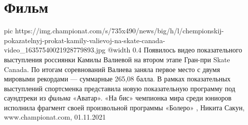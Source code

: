  
 
 
 
 
\chapter{Фильм}

\ifcmt
  pic https://img.championat.com/s/735x490/news/big/h/l/chempionskij-pokazatelnyj-prokat-kamily-valievoj-na-skate-canada-video_16357540021928779893.jpg
  @width 0.4
\fi
Появилось видео показательного выступления россиянки Камилы Валиевой на втором
этапе Гран-при Skate Canada. По итогам соревнований Валиева заняла первое место
с двумя мировыми рекордами — суммарные 265,08 балла.  В рамках показательных
выступлений спортсменка представила новую показательную программу под
саундтреки из \emph{фильма} «Аватар». «На бис» чемпионка мира среди юниоров
исполнила фрагмент своей произвольной программы «Болеро»
, 
Никита Сакун, www.championat.com, 01.11.2021
